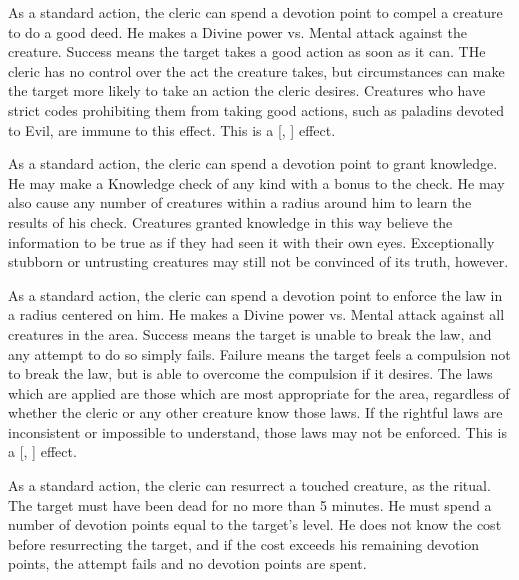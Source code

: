             As a standard action, the cleric can spend a devotion point to compel a creature to do a good deed.
            He makes a Divine power vs. Mental attack against the creature.
            Success means the target takes a good action as soon as it can.
            THe cleric has no control over the act the creature takes, but circumstances can make the target more likely to take an action the cleric desires.
            Creatures who have strict codes prohibiting them from taking good actions, such as paladins devoted to Evil, are immune to this effect.
            This is a [, ] effect.

            As a standard action, the cleric can spend a devotion point to grant knowledge.
            He may make a Knowledge check of any kind with a  bonus to the check.
            He may also cause any number of creatures within a \arealarge radius around him to learn the results of his check.
            Creatures granted knowledge in this way believe the information to be true as if they had seen it with their own eyes.
            Exceptionally stubborn or untrusting creatures may still not be convinced of its truth, however.

            As a standard action, the cleric can spend a devotion point to enforce the law in a \arealarge radius  centered on him.
            He makes a Divine power vs. Mental attack against all creatures in the area.
            Success means the target is unable to break the law, and any attempt to do so simply fails.
            Failure means the target feels a compulsion not to break the law, but is able to overcome the compulsion if it desires.
            The laws which are applied are those which are most appropriate for the area, regardless of whether the cleric or any other creature know those laws.
            If the rightful laws are inconsistent or impossible to understand, those laws may not be enforced.
            This is a [, ] effect.

            As a standard action, the cleric can resurrect a touched creature, as the  ritual.
            The target must have been dead for no more than 5 minutes.
            He must spend a number of devotion points equal to the target's level.
            He does not know the cost before resurrecting the target, and if the cost exceeds his remaining devotion points, the attempt fails and no devotion points are spent.

